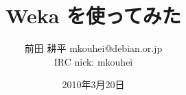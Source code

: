 




\documentclass[cjk,dvipdfmx,12pt]{beamer}
\usepackage{monthlypresentation}


\title{Weka を使ってみた}
\subtitle{}
\author{前田 耕平 mkouhei@debian.or.jp\\IRC nick: mkouhei}
\date{2010年3月20日}



